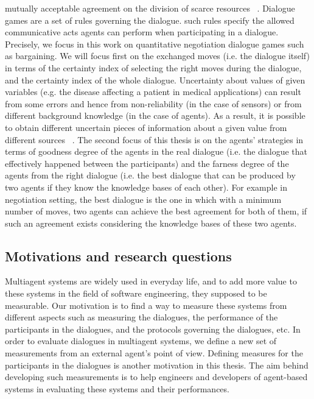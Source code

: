 mutually acceptable agreement on the division of scarce resources ~\cite{Rahwan03,Bentahar07}. Dialogue games are a set of rules governing the
dialogue. such rules specify the allowed communicative acts agents can perform when participating in  a dialogue. Precisely, we focus in this
work on quantitative negotiation dialogue games such as bargaining. We will focus first on the exchanged moves (i.e. the dialogue itself) in
terms of the certainty index of selecting the right moves during the dialogue, and the certainty index of the whole dialogue. Uncertainty about
values of given variables (e.g. the disease affecting a patient in medical applications) can result from some errors and hence from non-reliability
(in the case of sensors) or from different background knowledge (in the case of agents). As a result, it is possible to obtain different uncertain
pieces of information about a given value from different sources ~\cite{Jenhani07}. The second focus of this thesis is on the agents' strategies in
terms of goodness degree of the agents in the real dialogue (i.e. the dialogue that effectively happened between the participants) and the farness
degree of the agents from the right dialogue (i.e. the best dialogue that can be produced by two agents if they know the knowledge bases of each other).
For example in negotiation setting, the best dialogue is the one in which with a minimum number of moves, two agents can achieve the best agreement for
both of them, if such an agreement exists considering the knowledge bases of these two agents.
%



\subsection{Motivations and research questions}\label{sec:motivation}

Multiagent systems are widely used in everyday life, and to add more value to these systems in the field of software engineering,
they supposed to be measurable. Our motivation is to find a way to measure these systems from different aspects such as measuring
the dialogues, the performance of the participants in the dialogues, and the protocols governing the dialogues, etc. In order to evaluate
dialogues in multiagent systems, we define a new set of measurements from an external agent's point of view. Defining measures for the
participants in the dialogues is another motivation in this thesis. The aim behind developing such measurements is to help engineers and
developers of agent-based systems in evaluating these systems and their performances.\\

